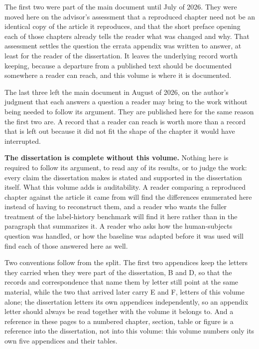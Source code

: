 \documentclass[
    12pt,
    openright,
    oneside,
    a4paper,
    sumario=tradicional,
    brazil,
    english,
]{abntex2}
\begin{document}
    The first two were part of the main document until July of 2026. They were moved here on the
    advisor's assessment that a reproduced chapter need not be an identical copy of the article
    it reproduces, and that the short preface opening each of those chapters already tells the
    reader what was changed and why. That assessment settles the question the errata appendix
    was written to answer, at least for the reader of the dissertation. It leaves the underlying
    record worth keeping, because a departure from a published text should be documented
    somewhere a reader can reach, and this volume is where it is documented.

    The last three left the main document in August of 2026, on the author's judgment that each
    answers a question a reader may bring to the work without being needed to follow its argument.
    They are published here for the same reason the first two are. A record that a reader can reach
    is worth more than a record that is left out because it did not fit the shape of the chapter it
    would have interrupted.

    \textbf{The dissertation is complete without this volume.} Nothing here is required to
    follow its argument, to read any of its results, or to judge the work: every claim the
    dissertation makes is stated and supported in the dissertation itself. What this volume adds
    is auditability. A reader comparing a reproduced chapter against the article it came from
    will find the differences enumerated here instead of having to reconstruct them, and a
    reader who wants the fuller treatment of the label-history benchmark will find it here
    rather than in the paragraph that summarizes it. A reader who asks how the human-subjects
    question was handled, or how the baseline was adapted before it
    was used will find each of those answered here as well.

    Two conventions follow from the split. The first two appendices keep the letters they carried
    when they were part of the dissertation, B and D, so that the records and correspondence that
    name them by letter still point at the same material, while the two that arrived later carry
    E and F, letters of this volume alone; the dissertation letters its own appendices
    independently, so an appendix letter should always be read together with the volume it belongs
    to. And a reference in
    these pages to a numbered chapter, section, table or figure is a reference into the
    dissertation, not into this volume: this volume numbers only its own five appendices and
    their tables.
\end{document}
